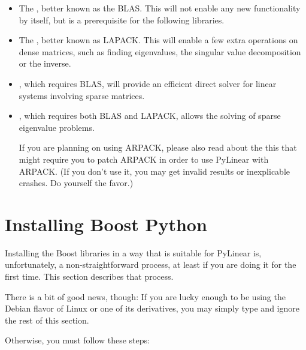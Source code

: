 \begin{itemize}
  \item The , better known as the BLAS. This will
    not enable any new functionality by itself, but is a
    prerequisite for the following libraries.
  \item The , better known as LAPACK. This will enable a few
    extra operations on dense matrices, such as finding eigenvalues,
    the singular value decomposition or the inverse.
  \item {},
    which requires BLAS, will provide an efficient direct solver
    for linear systems involving sparse matrices.
  \item {},
    which requires both BLAS and LAPACK, allows the solving of
    sparse eigenvalue problems.

    If you are planning on using ARPACK, please also read about the
    this  that might
    require you to patch ARPACK in order to use PyLinear with ARPACK.
    (If you don't use it, you may get invalid results or inexplicable
    crashes. Do yourself the favor.)
\end{itemize}

\section{Installing Boost Python}

\label{sec:install-bpl}

Installing the Boost libraries in a way that is suitable for PyLinear
is, unfortunately, a non-straightforward process, at least if you are
doing it for the first time. This section describes that process.

There is a bit of good news, though: If you are lucky enough to be
using the Debian flavor of Linux or one of its derivatives, you may
simply type  and ignore the
rest of this section.

Otherwise, you must follow these steps:

